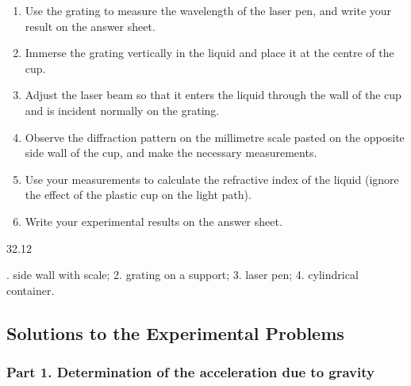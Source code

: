 \begin{enumerate}
\item[(1)] Use the grating to measure the wavelength of the laser pen, and write your result on the answer sheet.
\item[(2)] Immerse the grating vertically in the liquid and place it at the centre of the cup.
\item[(3)] Adjust the laser beam so that it enters the liquid through the wall of the cup and is incident normally on the grating.
\item[(4)] Observe the diffraction pattern on the millimetre scale pasted on the opposite side wall of the cup, and make the necessary measurements.
\item[(5)] Use your measurements to calculate the refractive index of the liquid (ignore the effect of the plastic cup on the light path).
\item[(6)] Write your experimental results on the answer sheet.
\end{enumerate}

\begin{figbox}{32.12}
\end{figbox}

. side wall with scale; 2. grating on a support; 3. laser pen; 4. cylindrical container.

\subsection*{Solutions to the Experimental Problems}

\subsubsection*{Part 1. Determination of the acceleration due to gravity}

